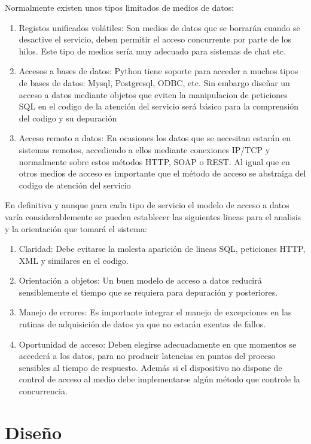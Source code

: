 \documentclass[a4paper,spanish,12pt]{book}
\begin{document}
Normalmente existen unos tipos limitados de medios de datos:
\begin{enumerate}
	\item{Registos unificados volátiles: Son medios de datos que se borrarán cuando se desactive el servicio, deben permitir el acceso concurrente por parte de los hilos. Este tipo de medios sería muy adecuado para sistemas de chat etc.}
	\item{Accesos a bases de datos: Python tiene soporte para acceder a muchos tipos de bases de datos: Mysql, Postgresql, ODBC, etc. Sin embargo diseñar un acceso a datos mediante objetos que eviten la manipulacion de peticiones SQL en el codigo de la atención del servicio será básico para la comprensión del codigo y su depuración}
	\item{Acceso remoto a datos: En ocasiones los datos que se necesitan estarán en sistemas remotos, accediendo a ellos mediante conexiones IP/TCP y normalmente sobre estos m\'etodos HTTP, SOAP o REST. Al igual que en otros medios de acceso es importante que el m\'etodo de acceso se abstraiga del codigo de atención del servicio}
\end{enumerate}
En definitiva y aunque para cada tipo de servicio el modelo de acceso a datos varía considerablemente se pueden establecer las siguientes lineas para el analisis y la orientación que tomará el sistema:
\begin{enumerate}
	\item{Claridad: Debe evitarse la molesta aparición de lineas SQL, peticiones HTTP, XML y similares en el codigo.}
	\item{Orientación a objetos: Un buen modelo de acceso a datos reducirá sensiblemente el tiempo que se requiera para depuración y posteriores.}
	\item{Manejo de errores: Es importante integrar el manejo de excepciones en las rutinas de adquisición de datos ya que no estarán exentas de fallos.}
	\item{Oportunidad de acceso: Deben elegirse adecuadamente en que momentos se accederá a los datos, para no producir latencias en puntos del proceso sensibles al tiempo de respuesto. Además si el dispositivo no dispone de control de acceso al medio debe implementarse algún m\'etodo que controle la concurrencia.}
	
\end{enumerate}

\section{Diseño}
\end{document}
